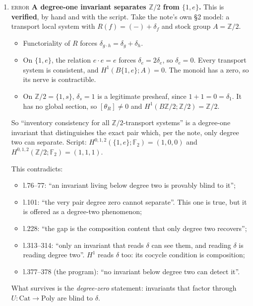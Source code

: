 \documentclass[11pt]{article}
\newcommand{\Z}{\mathbb{Z}}
\newcommand{\iss}[1]{\textsc{#1}}
\begin{document}
\begin{enumerate}[label=\textbf{1.\arabic*},leftmargin=*]
\item \iss{error} \textbf{A degree-one invariant separates $\Z/2$ from $\{1,e\}$.} This is
\textbf{verified}, by hand and with the script. Take the note's own \S2 model: a transport local
system with $R(f)=(-)+\delta_f$ and stock group $A=\Z/2$.
\begin{itemize}[leftmargin=1.2em]
\item Functoriality of $R$ forces $\delta_{g\cdot h}=\delta_g+\delta_h$.
\item On $\{1,e\}$, the relation $e\cdot e=e$ forces $\delta_e=2\delta_e$, so $\delta_e=0$. Every
transport system is consistent, and $H^1(B\{1,e\};A)=0$. The monoid has a zero, so its nerve is
contractible.
\item On $\Z/2=\{1,s\}$, $\delta_s=1$ is a legitimate presheaf, since $1+1=0=\delta_1$. It has no
global section, so $[\theta_R]\ne0$ and $H^1(B\Z/2;\Z/2)=\Z/2$.
\end{itemize}
So ``inventory consistency for all $\Z/2$-transport systems'' is a degree-one invariant that
distinguishes the exact pair which, per the note, only degree two can separate. Script:
$H^{0,1,2}(\{1,e\};\mathbb F_2)=(1,0,0)$ and $H^{0,1,2}(\Z/2;\mathbb F_2)=(1,1,1)$.

This contradicts:
\begin{itemize}[leftmargin=1.2em]
\item l.76--77: ``an invariant living below degree two is provably blind to it'';
\item l.101: ``the very pair degree zero cannot separate''. This one is true, but it is offered as
a degree-two phenomenon;
\item l.228: ``the gap is the composition content that only degree two recovers'';
\item l.313--314: ``only an invariant that reads $\delta$ can see them, and reading $\delta$ is
reading degree two''. $H^1$ reads $\delta$ too: its cocycle condition is composition;
\item l.377--378 (the program): ``no invariant below degree two can detect it''.
\end{itemize}
What survives is the \emph{degree-zero} statement: invariants that factor through
$U\colon\mathrm{Cat}\to\mathrm{Poly}$ are blind to $\delta$.


\end{enumerate}
\end{document}
